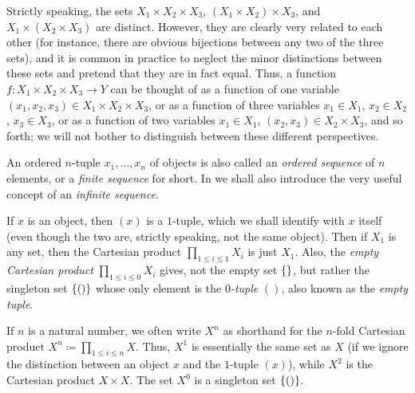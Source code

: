 \begin{note}
  Strictly speaking, the sets \(X_1 \times X_2 \times X_3\), \((X_1 \times X_2) \times X_3\), and \(X_1 \times (X_2 \times X_3)\) are distinct.
  However, they are clearly very related to each other (for instance, there are obvious bijections between any two of the three sets), and it is common in practice to neglect the minor distinctions between these sets and pretend that they are in fact equal.
  Thus, a function \(f : X_1 \times X_2 \times X_3 \to Y\) can be thought of as a function of one variable \((x_1, x_2, x_3) \in X_1 \times X_2 \times X_3\), or as a function of three variables \(x_1 \in X_1\), \(x_2 \in X_2\), \(x_3 \in X_3\), or as a function of two variables \(x_1 \in X_1\), \((x_2, x_3) \in X_2 \times X_3\), and so forth;
  we will not bother to distinguish between these different perspectives.
\end{note}

\setcounter{thm}{9}
\begin{rmk}\label{i:3.5.10}
  An ordered \(n\)-tuple \(x_1, \dots, x_n\) of objects is also called an \emph{ordered sequence} of \(n\) elements, or a \emph{finite sequence} for short.
  In  we shall also introduce the very useful concept of an \emph{infinite sequence}.
\end{rmk}

\begin{eg}\label{i:3.5.11}
  If \(x\) is an object, then \((x)\) is a \(1\)-tuple, which we shall identify with \(x\) itself (even though the two are, strictly speaking, not the same object).
  Then if \(X_1\) is any set, then the Cartesian product \(\prod_{1 \leq i \leq 1} X_i\) is just \(X_1\).
  Also, the \emph{empty Cartesian product} \(\prod_{1 \leq i \leq 0} X_i\) gives, not the empty set \(\left\lbrace\right\rbrace\), but rather the singleton set \(\left\lbrace()\right\rbrace\) whose only element is the \emph{\(0\)-tuple} \(()\), also known as the \emph{empty tuple}.

  If \(n\) is a natural number, we often write \(X^n\) as shorthand for the \(n\)-fold Cartesian product \(X^n \coloneqq \prod_{1 \leq i \leq n} X\).
  Thus, \(X^1\) is essentially the same set as \(X\) (if we ignore the distinction between an object \(x\) and the \(1\)-tuple \((x)\)), while \(X^2\) is the Cartesian product \(X \times X\).
  The set \(X^0\) is a singleton set \(\left\lbrace()\right\rbrace\).
\end{eg}

